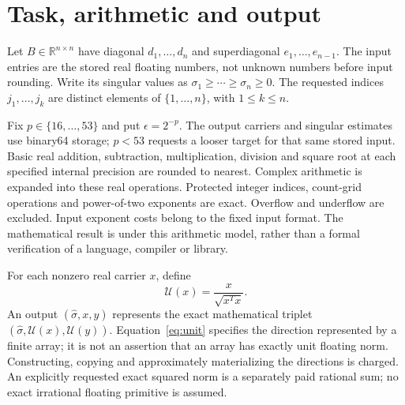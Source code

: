 \documentclass[11pt]{article}
\theoremstyle{remark}\newtheorem{remark}[theorem]{Remark}
\newcommand{\R}{\mathbb R}
\newcommand{\unit}[1]{\mathcal U(#1)}
\begin{document}
\section{Task, arithmetic and output}\label{sec:model}
Let $B\in\R^{n\times n}$ have diagonal $d_1,\ldots,d_n$ and superdiagonal
$e_1,\ldots,e_{n-1}$. The input entries are the stored real floating numbers,
not unknown numbers before input rounding. Write its singular values as
$\sigma_1\ge\cdots\ge\sigma_n\ge0$. The requested indices
$j_1,\ldots,j_k$ are distinct elements of $\{1,\ldots,n\}$, with $1\le k\le n$.

Fix $p\in\{16,\ldots,53\}$ and put $\epsilon=2^{-p}$. The output carriers
and singular estimates use binary64 storage; $p<53$ requests a looser target
for that same stored input. Basic real addition, subtraction, multiplication,
division and square root at each specified internal precision are rounded to
nearest. Complex arithmetic is expanded into these real operations. Protected
integer indices, count-grid operations and power-of-two exponents are exact.
Overflow and underflow are excluded. Input exponent costs belong to the fixed
input format. The mathematical result is under this arithmetic model, rather
than a formal verification of a language, compiler or library.

For each nonzero real carrier $x$, define
\begin{equation}\label{eq:unit}
  \unit{x}=\frac{x}{\sqrt{x^Tx}}.
\end{equation}
An output $(\widehat\sigma,x,y)$ represents the exact mathematical triplet
$(\widehat\sigma,\unit{x},\unit{y})$. Equation~\eqref{eq:unit} specifies
the direction represented by a finite array; it is not an assertion that an
array has exactly unit floating norm. Constructing, copying and approximately
materializing the directions is charged. An explicitly requested exact
squared norm is a separately paid rational sum; no exact irrational floating
primitive is assumed.
\end{document}
